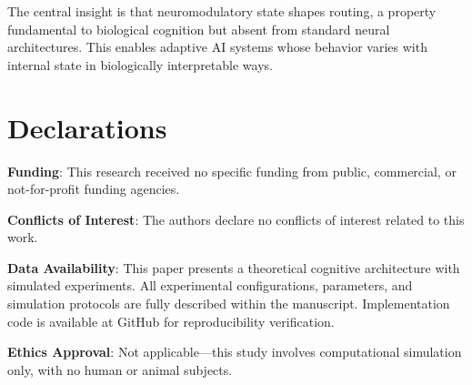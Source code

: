 \documentclass[preprint,12pt]{elsarticle}
\begin{document}
The central insight is that neuromodulatory state shapes routing, a property fundamental to biological cognition but absent from standard neural architectures. This enables adaptive AI systems whose behavior varies with internal state in biologically interpretable ways.

\section*{Declarations}

\textbf{Funding}: This research received no specific funding from public, commercial, or not-for-profit funding agencies.

\textbf{Conflicts of Interest}: The authors declare no conflicts of interest related to this work.

\textbf{Data Availability}: This paper presents a theoretical cognitive architecture with simulated experiments. All experimental configurations, parameters, and simulation protocols are fully described within the manuscript. Implementation code is available at GitHub for reproducibility verification.

\textbf{Ethics Approval}: Not applicable---this study involves computational simulation only, with no human or animal subjects.


\end{document}
